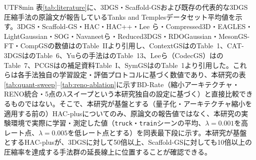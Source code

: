 \documentclass{ieeeaccess}
\begin{document}
\begin{CJK}{UTF8}{min}
表\ref{tab:literature}に、3DGS・Scaffold-GSおよび既存の代表的な3DGS圧縮手法の原論文が報告しているTanks and Templesデータセット平均値を示す。3DGS・Scaffold-GS・HAC・HAC++・Lee ら・Compressed3D・EAGLES・LightGaussian・SOG・Navaneetら・Reduced3DGS・RDOGaussian・MesonGS-FT・CompGSの数値は\cite{chen2025hacpp}のTable~IIより引用し、ContextGSは\cite{wang2024contextgs}のTable~1、CAT-3DGSは\cite{zhan2025cat3dgs}のTable~6、Yuらの手法は\cite{yu2026practical}のTable~13、Leeら（CodecGS）は\cite{lee2025codecgs}のTable~7、PCGSは\cite{chen2025pcgs}の補足資料Table~I、SymGSは\cite{gupta2025symgs}のTable~1より引用した。これらは各手法独自の学習設定・評価プロトコルに基づく数値であり、本研究の表\ref{tab:quant-sweep}--\ref{tab:reno-ablation}に示すBD-Rate（縮小アーキテクチャ・RENO統合・5点の$\lambda$スイープという本研究独自の設定に基づく）と直接比較できるものではない。そこで、本研究が基盤とする（量子化・アーキテクチャ縮小を適用する前の）HAC-plusについてのみ、原論文の報告値ではなく、本研究の実験環境で実際に学習・測定した値（\texttt{truck}・\texttt{train}シーンの平均、$\lambda=0.001$を高レート点、$\lambda=0.005$を低レート点とする）を同表最下段に示す。本研究が基盤とするHAC-plusが、3DGSに対して50倍以上、Scaffold-GSに対しても10倍以上の圧縮率を達成する手法群の延長線上に位置することが確認できる。


\end{CJK}
\end{document}
